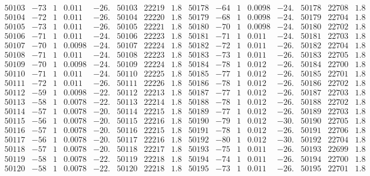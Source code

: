 \documentclass[11pt,reqno,a4letter]{article}
\numberwithin{figure}{section}
\numberwithin{table}{section}
\theoremstyle{plain}
\numberwithin{theorem}{section}
\theoremstyle{definition}
\begin{document}
\begin{table}[ht]
\begin{equation*}
{\begin{array}{ccccc|ccc||ccccc|ccc}
50103 & -73 & 1 & 0.011 & -26. & 50103 & 22219 & 1.8 & 50178 & -64 & 1 & 0.0098 & -24. & 50178 & 22708 & 1.8  \\
50104 & -72 & 1 & 0.011 & -26. & 50104 & 22220 & 1.8 & 50179 & -68 & 1 & 0.0098 & -24. & 50179 & 22704 & 1.8  \\
50105 & -73 & 1 & 0.011 & -26. & 50105 & 22221 & 1.8 & 50180 & -70 & 1 & 0.0098 & -24. & 50180 & 22702 & 1.8  \\
50106 & -71 & 1 & 0.011 & -24. & 50106 & 22223 & 1.8 & 50181 & -71 & 1 & 0.011 & -24. & 50181 & 22703 & 1.8  \\
50107 & -70 & 1 & 0.0098 & -24. & 50107 & 22224 & 1.8 & 50182 & -72 & 1 & 0.011 & -26. & 50182 & 22704 & 1.8  \\
50108 & -71 & 1 & 0.011 & -24. & 50108 & 22223 & 1.8 & 50183 & -73 & 1 & 0.011 & -26. & 50183 & 22705 & 1.8  \\
50109 & -70 & 1 & 0.0098 & -24. & 50109 & 22224 & 1.8 & 50184 & -78 & 1 & 0.012 & -26. & 50184 & 22700 & 1.8  \\
50110 & -71 & 1 & 0.011 & -24. & 50110 & 22225 & 1.8 & 50185 & -77 & 1 & 0.012 & -26. & 50185 & 22701 & 1.8  \\
50111 & -72 & 1 & 0.011 & -26. & 50111 & 22226 & 1.8 & 50186 & -78 & 1 & 0.012 & -26. & 50186 & 22702 & 1.8  \\
50112 & -59 & 1 & 0.0098 & -22. & 50112 & 22213 & 1.8 & 50187 & -77 & 1 & 0.012 & -26. & 50187 & 22703 & 1.8  \\
50113 & -58 & 1 & 0.0078 & -22. & 50113 & 22214 & 1.8 & 50188 & -78 & 1 & 0.012 & -26. & 50188 & 22702 & 1.8  \\
50114 & -57 & 1 & 0.0078 & -20. & 50114 & 22215 & 1.8 & 50189 & -77 & 1 & 0.012 & -26. & 50189 & 22703 & 1.8  \\
50115 & -56 & 1 & 0.0078 & -20. & 50115 & 22216 & 1.8 & 50190 & -79 & 1 & 0.012 & -30. & 50190 & 22705 & 1.8  \\
50116 & -57 & 1 & 0.0078 & -20. & 50116 & 22215 & 1.8 & 50191 & -78 & 1 & 0.012 & -26. & 50191 & 22706 & 1.8  \\
50117 & -56 & 1 & 0.0078 & -20. & 50117 & 22216 & 1.8 & 50192 & -80 & 1 & 0.012 & -30. & 50192 & 22704 & 1.8  \\
50118 & -57 & 1 & 0.0078 & -20. & 50118 & 22217 & 1.8 & 50193 & -75 & 1 & 0.011 & -26. & 50193 & 22699 & 1.8  \\
50119 & -58 & 1 & 0.0078 & -22. & 50119 & 22218 & 1.8 & 50194 & -74 & 1 & 0.011 & -26. & 50194 & 22700 & 1.8  \\
50120 & -58 & 1 & 0.0078 & -22. & 50120 & 22218 & 1.8 & 50195 & -73 & 1 & 0.011 & -26. & 50195 & 22701 & 1.8  \\

\end{array}}
\end{equation*}
\end{table}
\end{document}

